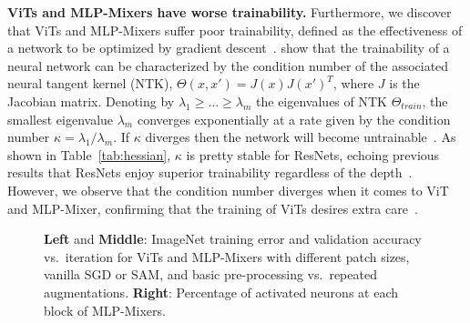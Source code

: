 \documentclass{article}
\begin{document}
\textbf{ViTs and MLP-Mixers have worse trainability.} 
Furthermore, we discover that ViTs and MLP-Mixers suffer poor trainability, defined as the effectiveness of a network to be optimized by gradient descent~\cite{pmlr-v119-xiao20b, burkholz2019init, shin2020trainability}.
\citet{pmlr-v119-xiao20b} show that the trainability of a neural network can be characterized by the condition number of the associated neural tangent kernel (NTK), $\Theta(x, x') = J(x)J(x')^T$, where $J$ is the Jacobian matrix.
Denoting by $\lambda_1 \geq \dots \geq \lambda_m$ the eigenvalues of NTK $\Theta_{train}$, the smallest eigenvalue $\lambda_m$ converges exponentially at a rate given by the condition number $\kappa=\lambda_1 / \lambda_m$.
If $\kappa$ diverges then the network will become untrainable~\cite{pmlr-v119-xiao20b, chen2021neural}.
As shown in Table~\ref{tab:hessian}, $\kappa$ is pretty stable for ResNets, echoing previous results that ResNets enjoy superior trainability regardless of the depth~\cite{yang2017mean, li2018visualize}.
However, we observe that the condition number diverges when it comes to ViT and MLP-Mixer, confirming that the training of ViTs desires extra care~\cite{chen2021empirical,touvron2021training}.

\begin{figure}
\centering
{}
\vspace{-5pt}
\caption{
\textbf{Left} and \textbf{Middle}: ImageNet training error and validation accuracy vs.\ iteration for ViTs and MLP-Mixers with different patch sizes, vanilla SGD  or SAM, and basic pre-processing vs.\ repeated augmentations. 
\textbf{Right}: Percentage of activated neurons at each block of MLP-Mixers.
}
\vspace{-10pt}
\label{fig:loss-acc}
\end{figure}
\end{document}

